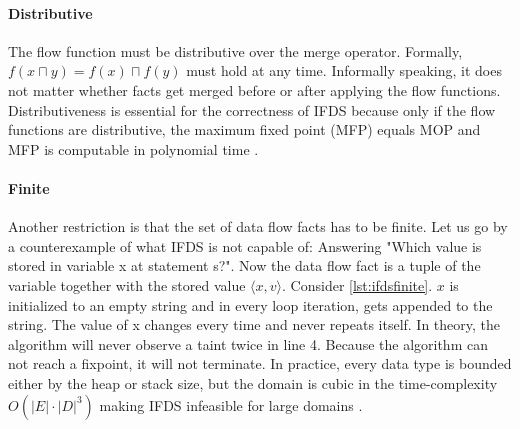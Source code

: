 \documentclass[../draft.tex]{subfiles}
\begin{document}
    \paragraph{Distributive} The flow function must be distributive over the merge operator. 
    Formally, $f(x \sqcap y) = f(x) \sqcap f(y)$ must hold at any time. 
    Informally speaking, it does not matter whether facts get merged before or after applying the flow functions. 
    Distributiveness is essential for the correctness of IFDS because only if the flow functions are distributive, the maximum fixed point (MFP) equals MOP and MFP is computable in polynomial time \cite{Khedker2009,Reps1995}.

    \paragraph{Finite} Another restriction is that the set of data flow facts has to be finite. 
    Let us go by a counterexample of what IFDS is not capable of: Answering "Which value is stored in variable x at statement s?".
    Now the data flow fact is a tuple of the variable together with the stored value $\langle x, v \rangle$. 
    Consider \autoref{lst:ifdsfinite}. 
    $x$ is initialized to an empty string and in every loop iteration,  gets appended to the string. 
    The value of x changes every time and never repeats itself. 
    In theory, the algorithm will never observe a taint twice in line 4. 
    Because the algorithm can not reach a fixpoint, it will not terminate. 
    In practice, every data type is bounded either by the heap or stack size, but the domain is cubic in the time-complexity $O(|E| \cdot |D|^3)$ making IFDS infeasible for large domains \cite{Reps1995}.
\end{document}
